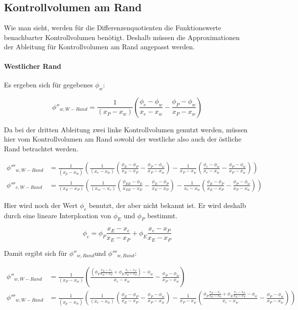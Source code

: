\documentclass[10pt, ngerman,colorback,accentcolor=tud2d]{tudreport}
\begin{document}
\subsection{Kontrollvolumen am Rand}


Wie man sieht, werden für die Differenzenquotienten die Funktionswerte benachbarter
Kontrollvolumen benötigt. Deshalb müssen die Approximationen der Ableitung für
Kontrollvolumen am Rand angepasst werden.

\paragraph{Westlicher Rand}

Es ergeben sich für gegebenes $\phi_w$:


\begin{equation*}
  \phi''_{w, W-Rand} = \frac{1}{(x_P-x_w)}\left({
\frac{\phi_{e}-\phi_w}{x_{e}-x_w}-\frac{\phi_P-\phi_w}{x_P-x_w}}\right)
\end{equation*}

Da bei der dritten Ableitung zwei linke Kontrollvolumen genutzt werden, müssen hier
vom Kontrollvolumen am Rand sowohl der westliche also auch der östliche Rand
betrachtet werden.

\begin{align*}
  \phi'''_{w, W-Rand} &= \frac{1}{(x_p-x_w)} \left({
  \frac{1}{(x_e-x_w)} \left({
    \frac{\phi_E-\phi_P}{x_E-x_P} - \frac{\phi_P-\phi_w}{x_P-x_w}
    }\right) -
  \frac{1}{x_P-x_w} \left({
    \frac{\phi_e-\phi_w}{x_e-x_w} - \frac{\phi_P-\phi_w}{x_P-x_w}
    }\right)
  }\right)
  \\
  \phi'''_{e, W-Rand} &= \frac{1}{(x_E-x_P)} \left({
  \frac{1}{(x_{ee}-x_e)} \left({
      \frac{\phi_{EE}-\phi_E}{x_{EE}-x_E} - \frac{\phi_E-\phi_P}{x_E-x_P}
    }\right) -
  \frac{1}{x_e-x_w} \left({
    \frac{\phi_E-\phi_P}{x_E-x_P} - \frac{\phi_P-\phi_w}{x_P-x_w}
    }\right)
  }\right)
\end{align*}

Hier wird noch der Wert $\phi_e$ benutzt, der aber nicht bekannt ist. Er wird deshalb
durch eine lineare Interploation von $\phi_E$ und $\phi_P$ bestimmt.

\begin{equation}
  \phi_e = \phi_P \frac{x_E-x_e}{x_E-x_P} + \phi_E \frac{x_e-x_P}{x_E-x_P}
\end{equation}

Damit ergibt sich für $\phi''_{w,Rand}$und $\phi'''_{w, Rand}$:

\begin{align}
  \phi''_{w, W-Rand} &= \frac{1}{(x_P-x_w)}\left({
\frac{
  \left({\phi_P \frac{x_E-x_e}{x_E-x_P} + \phi_E \frac{x_e-x_P}{x_E-x_P}
}\right)
-\phi_w}{x_{e}-x_w}-\frac{\phi_P-\phi_w}{x_P-x_w}}\right)\\
  \phi'''_{w, W-Rand} &= \frac{1}{(x_p-x_w)} \left({
  \frac{1}{(x_e-x_w)} \left({
    \frac{\phi_E-\phi_P}{x_E-x_P} - \frac{\phi_P-\phi_w}{x_P-x_w}
    }\right) -
  \frac{1}{x_P-x_w} \left({
    \frac{ \phi_P \frac{x_E-x_e}{x_E-x_P} + \phi_E \frac{x_e-x_P}{x_E-x_P}
-\phi_w}{x_e-x_w} - \frac{\phi_P-\phi_w}{x_P-x_w}
    }\right)
  }\right)
\end{align}
\end{document}
